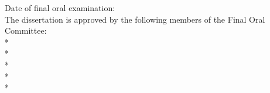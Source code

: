 {\begin{titlepage}
\noindent Date of final oral examination: \@oralexamdate \hspace*{\fill} \\[\@thesistitlemedskip]
\noindent The dissertation is approved by the following members of the Final Oral Committee:\\*
\indent \@committeeone\\*
\indent \@committeetwo\\*
\indent \@committeethree\\*
\indent \@committeefour\\*
\indent \@committeefive


  \end{titlepage}

  \setcounter{footnote}{0}
  \setcounter{page}{1} %
  \let\thanks\relax
  \let\maketitle\relax \let\degree\relax \let\project\relax \let\prelim\relax
  \let\department\relax
  \gdef\@thanks{}\gdef\@degree{}\gdef\@doctype{}
  \gdef\@department{}
}


\def\abstract{
  \chapter*{Abstract}
  \addcontentsline{toc}{chapter}{Abstract}
  \relax\markboth{Abstract}{Abstract}}
\def\endabstract{\par\newpage}




